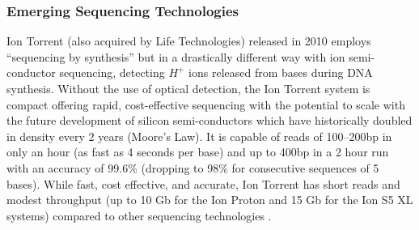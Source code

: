 
\iffalse
\subsubsection{Emerging Sequencing Technologies}

Ion Torrent (also acquired by Life Technologies) released in 2010 employs ``sequencing by synthesis'' but in a drastically different way with ion semi-conductor sequencing, detecting $H^+$ ions released from bases during \acrshort{DNA} synthesis. Without the use of optical detection, the Ion Torrent system is compact offering rapid, cost-effective sequencing with the potential to scale with the future development of silicon semi-conductors which have historically doubled in density every 2 years (Moore's Law). It is capable of reads of 100--200bp in only an hour (as fast as 4 seconds per base) and up to 400bp in a 2 hour run with an accuracy of 99.6\% (dropping to 98\% for consecutive sequences of 5 bases). While fast, cost effective, and accurate, Ion Torrent has short reads and modest throughput (up to 10 Gb for the Ion Proton and 15 Gb for the Ion S5 XL systems) compared to other sequencing technologies \citep{iontorrent}.

